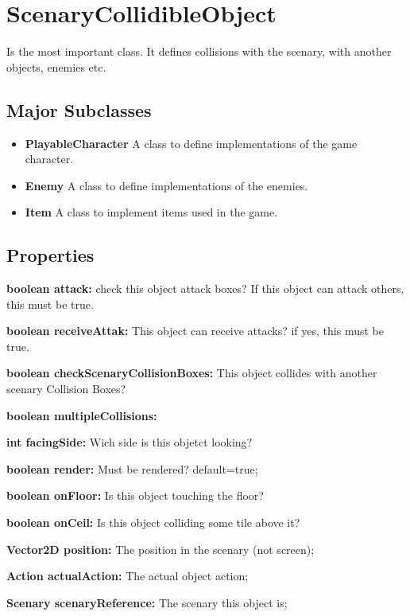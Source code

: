 \chapter{ScenaryCollidibleObject}
	Is the most important class. It defines collisions with the scenary, with another objects, enemies etc.
	
	\section{Major Subclasses}
		\begin{itemize}
			\item \textbf{PlayableCharacter} A class to define implementations of the game character.
			\item \textbf{Enemy} A class to define implementations of the enemies.
			\item \textbf{Item} A class to implement items used in the game.
		\end{itemize}
		
	
	\section{Properties}
	\textbf{boolean attack:} check this object attack boxes? If this object can attack others, this must be true.
	
	\textbf{boolean receiveAttak:} This object can receive attacks? if yes, this must be true.
	
	\textbf{boolean checkScenaryCollisionBoxes:} This object collides with another scenary Collision Boxes?
	
	\textbf{boolean multipleCollisions:}
	
	\textbf{int facingSide:} Wich side is this objetct looking?
	
	\textbf{boolean render:} Must be rendered? default=true;
	
	\textbf{boolean onFloor:} Is this object touching the floor?
	
	\textbf{boolean onCeil:} Is this object colliding some tile above it?
	
	\textbf{Vector2D position:} The position in the scenary (not screen);
	
	\textbf{Action actualAction: } The actual object action;
	
	\textbf{Scenary scenaryReference:} The scenary this object is;
	
	